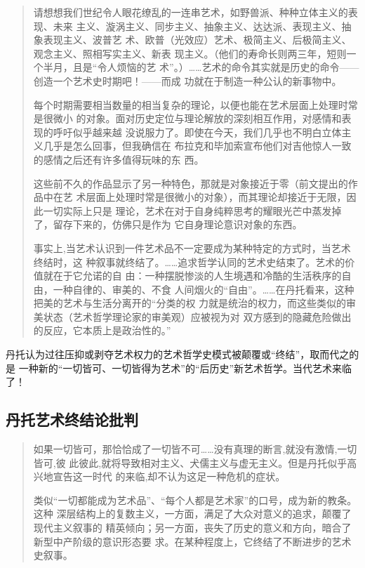 \begin{quotation}

  请想想我们世纪令人眼花缭乱的一连串艺术，如野兽派、种种立体主义的表现、未来
  主义、漩涡主义、同步主义、抽象主义、达达派、表现主义、抽象表现主义、波普艺
  术、欧普（光效应）艺术、极简主义、后极简主义、观念主义、照相写实主义、新表
  现主义。（他们的寿命长则两三年，短则一个半月，且是“令人烦恼的艺
  术”。）……艺术的命令其实就是历史的命令——创造一个艺术史时期吧！——而成
  功就在于制造一种公认的新事物中。

  每个时期需要相当数量的相当复杂的理论，以便也能在艺术层面上处理时常是很微小
  的对象。面对历史定位与理论解放的深刻相互作用，对感情和表现的呼吁似乎越来越
  没说服力了。即使在今天，我们几乎也不明白立体主义几乎是怎么回事，但我确信在
  布拉克和毕加索宣布他们对吉他惊人一致的感情之后还有许多值得玩味的东
  西。

  这些前不久的作品显示了另一种特色，那就是对象接近于零（前文提出的作品中在艺
  术层面上处理时常是很微小的对象），而其理论却接近于无限，因此一切实际上只是
  理论，艺术在对于自身纯粹思考的耀眼光芒中蒸发掉了，留存下来的，仿佛只是作为
  它自身理论意识对象的东西。

  事实上,当艺术认识到一件艺术品不一定要成为某种特定的方式时，当艺术终结时，这
  种叙事就终结了。……追求哲学认同的艺术史结束了。艺术的价值就在于它允诺的自
  由：一种摆脱惨淡的人生境遇和冷酷的生活秩序的自由，一种自律的、审美的、不食
  人间烟火的“自由”。……在丹托看来，这种把美的艺术与生活分离开的“分类的权
  力就是统治的权力，而这些类似的审美状态（艺术哲学理论家的审美观）应被视为对
  双方感到的隐藏危险做出的反应，它本质上是政治性的。”\cite{dantuozhenduan}

\end{quotation}

丹托认为过往压抑或剥夺艺术权力的艺术哲学史模式被颠覆或“终结”，取而代之的是
一种新的“一切皆可、一切皆得为艺术”的“后历史”新艺术哲学。当代艺术来临了！

\subsection{丹托艺术终结论批判}

\begin{quotation}

  如果一切皆可，那恰恰成了一切皆不可……没有真理的断言,就没有激情,一切皆可,彼
  此彼此,就将导致相对主义、犬儒主义与虚无主义。但是丹托似乎高兴地宣告这一时代
  的来临,却不认为这足一种危机的症状。\cite{fuwendantuo}

  类似“一切都能成为艺术品”、“每个人都是艺术家”的口号，成为新的教条。这种
  深层结构上的复数主义，一方面，满足了大众对意义的追求，颠覆了现代主义叙事的
  精英倾向；另一方面，丧失了历史的意义和方向，暗合了新型中产阶级的意识形态要
  求。在某种程度上，它终结了不断进步的艺术史叙事。\cite{dantuozhenduan}
\end{quotation}

